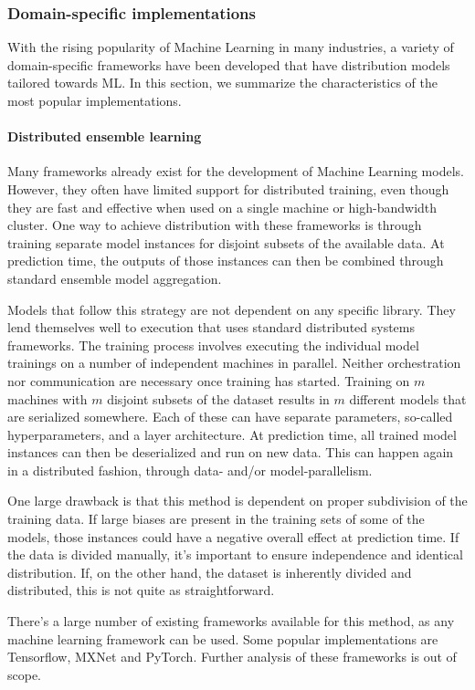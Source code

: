 \subsubsection{Domain-specific implementations}
With the rising popularity of Machine Learning in many industries, a variety of domain-specific frameworks have been developed that have distribution models tailored towards ML. In this section, we summarize the characteristics of the most popular implementations.

\paragraph{Distributed ensemble learning}
Many frameworks already exist for the development of Machine Learning models. However, they often have limited support for distributed training, even though they are fast and effective when used on a single machine or high-bandwidth cluster. One way to achieve distribution with these frameworks is through training separate model instances for disjoint subsets of the available data. At prediction time, the outputs of those instances can then be combined through standard ensemble model aggregation\citep{Opitz1999}.

Models that follow this strategy are not dependent on any specific library. They lend themselves well to execution that uses standard distributed systems frameworks. The training process involves executing the individual model trainings on a number of independent machines in parallel. Neither orchestration nor communication are necessary once training has started. Training on $m$ machines with $m$ disjoint subsets of the dataset results in $m$ different models that are serialized somewhere. Each of these can have separate parameters, so-called hyperparameters, and a layer architecture. At prediction time, all trained model instances can then be deserialized and run on new data. This can happen again in a distributed fashion, through data- and/or model-parallelism.

One large drawback is that this method is dependent on proper subdivision of the training data. If large biases are present in the training sets of some of the models, those instances could have a negative overall effect at prediction time. If the data is divided manually, it's important to ensure independence and identical distribution. If, on the other hand, the dataset is inherently divided and distributed, this is not quite as straightforward.

There's a large number of existing frameworks available for this method, as any machine learning framework can be used. Some popular implementations are Tensorflow\citep{Tensorflow2015}, MXNet\citep{MXNet2015} and PyTorch\citep{PyTorch2017}. Further analysis of these frameworks is out of scope.

